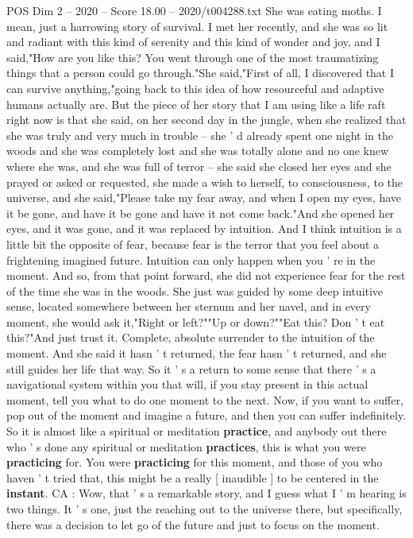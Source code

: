 \begin{textsample}{POS Dim 2 – 2020 – Score 18.00 – 2020/t004288.txt}
She was eating moths.
I mean, just a harrowing story of survival.
I met her recently, and she was so lit and radiant with this kind of serenity and this kind of wonder and joy, and I said,"How are you like this?
You went through one of the most traumatizing things that a person could go through."She said,"First of all, I discovered that I can survive anything,"going back to this idea of how resourceful and adaptive humans actually are.
But the piece of her story that I am using like a life raft right now is that she said, on her second day in the jungle, when she realized that she was truly and very much in trouble -- she ' d already spent one night in the woods and she was completely lost and she was totally alone and no one knew where she was, and she was full of terror -- she said she closed her eyes and she prayed or asked or requested, she made a wish to herself, to consciousness, to the universe, and she said,"Please take my fear away, and when I open my eyes, have it be gone, and have it be gone and have it not come back."And she opened her eyes, and it was gone, and it was replaced by intuition.
And I think intuition is a little bit the opposite of fear, because fear is the terror that you feel about a frightening imagined future.
Intuition can only happen when you ' re in the moment.
And so, from that point forward, she did not experience fear for the rest of the time she was in the woods.
She just was guided by some deep intuitive sense, located somewhere between her sternum and her navel, and in every moment, she would ask it,"Right or left?""Up or down?""Eat this?
Don ' t eat this?"And just trust it.
Complete, absolute surrender to the intuition of the moment.
And she said it hasn ' t returned, the fear hasn ' t returned, and she still guides her life that way.
So it ' s a return to some sense that there ' s a navigational system within you that will, if you stay present in this actual moment, tell you what to do one moment to the next.
Now, if you want to suffer, pop out of the moment and imagine a future, and then you can suffer indefinitely.
So it is almost like a spiritual or meditation \textbf{practice}, and anybody out there who ' s done any spiritual or meditation \textbf{practices}, this is what you were \textbf{practicing} for.
You were \textbf{practicing} for this moment, and those of you who haven ' t tried that, this might be a really [ inaudible ] to be centered in the \textbf{instant}.
CA : Wow, that ' s a remarkable story, and I guess what I ' m hearing is two things.
It ' s one, just the reaching out to the universe there, but specifically, there was a decision to let go of the future and just to focus on the moment.

\end{textsample}
